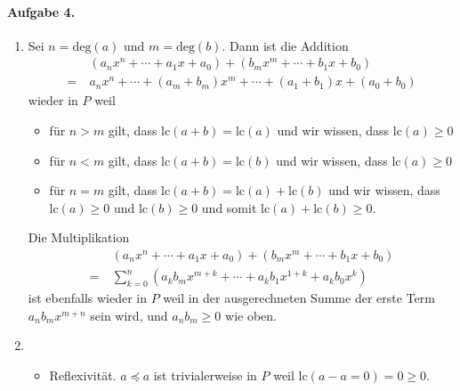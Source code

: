 \documentclass{article}
\begin{document}
\paragraph{Aufgabe 4.} 

\begin{enumerate}
    \item Sei $n = \text{deg}(a)$ und $m = \text{deg}(b)$. Dann ist die Addition
    \begin{align*}
        &(a_nx^n + \cdots + a_1x + a_0) + (b_mx^m + \cdots + b_1x + b_0) \\
        =\ &a_nx^n + \cdots + (a_m + b_m)x^m + \cdots + (a_1 + b_1)x + (a_0 + b_0) 
    \end{align*}
    wieder in $P$ weil
    \begin{itemize}
        \item für $n > m$ gilt, dass $\text{lc}(a + b) = \text{lc}(a)$ und wir wissen, dass $\text{lc}(a) \geq 0$
        \item für $n < m$ gilt, dass $\text{lc}(a + b) = \text{lc}(b)$ und wir wissen, dass $\text{lc}(a) \geq 0$
        \item für $n = m$ gilt, dass $\text{lc}(a + b) = \text{lc}(a) + \text{lc}(b)$ und wir wissen, dass $\text{lc}(a) \geq 0$ und $\text{lc}(b) \geq 0$ und somit $\text{lc}(a) + \text{lc}(b) \geq 0$.
    \end{itemize}
    Die Multiplikation
    \begin{align*}
        &(a_nx^n + \cdots + a_1x + a_0) + (b_mx^m + \cdots + b_1x + b_0) \\
        =\ &\sum_{k = 0}^n (a_kb_mx^{m + k} + \cdots + a_kb_1x^{1 + k} + a_kb_0x^k)
    \end{align*}
    ist ebenfalls wieder in $P$ weil in der ausgerechneten Summe der erste Term $a_nb_mx^{m + n}$ sein wird, und $a_nb_m \geq 0$ wie oben.

    \item \begin{itemize}
        \item Reflexivität. $a \preccurlyeq a$ ist trivialerweise in $P$ weil $\text{lc}(a - a = 0) = 0 \geq 0$.
        

\end{itemize}
\end{enumerate}
\end{document}
